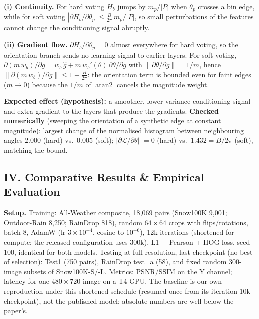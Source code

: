 \documentclass[8pt,a4paper]{article}
\begin{document}
\textbf{(i) Continuity.} For hard voting $H_b$ jumps by $m_p/|P|$ when $\theta_p$ crosses a bin edge, while for soft voting $|\partial H_b/\partial\theta_p|\le \tfrac{B}{2\pi}\,m_p/|P|$, so small perturbations of the features cannot change the conditioning signal abruptly.

\textbf{(ii) Gradient flow.} $\partial H_b/\partial\theta_p{=}0$ almost everywhere for hard voting, so the orientation branch sends no learning signal to earlier layers. For soft voting, $\partial(m\,w_b)/\partial g = w_b\,\hat g + m\,w_b'(\theta)\,\partial\theta/\partial g$ with $\lVert\partial\theta/\partial g\rVert{=}1/m$, hence $\lVert\partial(m\,w_b)/\partial g\rVert\le 1+\tfrac{B}{2\pi}$: the orientation term is bounded even for faint edges ($m{\to}0$) because the $1/m$ of $\operatorname{atan2}$ cancels the magnitude weight.

\textbf{Expected effect (hypothesis):} a smoother, lower-variance conditioning signal and extra gradient to the layers that produce the gradients. \textbf{Checked numerically} (sweeping the orientation of a synthetic edge at constant magnitude): largest change of the normalised histogram between neighbouring angles $2.000$ (hard) vs.\ $0.005$ (soft); $|\partial\mathcal L/\partial\theta|$ $=0$ (hard) vs.\ $1.432{=}B/2\pi$ (soft), matching the bound.

\subsection*{IV. Comparative Results \& Empirical Evaluation}
\textbf{Setup.} Training: All-Weather composite, 18{,}069 pairs (Snow100K 9{,}001; Outdoor-Rain 8{,}250; RainDrop 818), random $64{\times}64$ crops with flips/rotations, batch 8, AdamW (lr $3{\times}10^{-4}$, cosine to $10^{-6}$), 12k iterations (shortened for compute; the released configuration uses 300k), L1 + Pearson + HOG loss, seed 100, identical for both models. Testing at full resolution, last checkpoint (no best-of selection): Test1 (750 pairs), RainDrop test\_a (58), and fixed random 300-image subsets of Snow100K-S/-L. Metrics: PSNR/SSIM on the Y channel; latency for one $480{\times}720$ image on a T4 GPU. The baseline is our own reproduction under this shortened schedule (resumed once from its iteration-10k checkpoint), not the published model; absolute numbers are well below the paper's.
\end{document}
